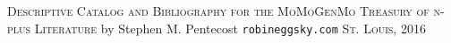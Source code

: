 \newpage
\begin{center}
\vspace*{5mm}
{\Huge
\textsc{Descriptive Catalog}
\linebreak
\linebreak
\textsc{and}
\linebreak
\linebreak
\textsc{Bibliography}
\linebreak
\linebreak
\textsc{for the}
\linebreak
\linebreak
\textsc{MoMoGenMo Treasury}
\linebreak
\linebreak
\textsc{of}
\linebreak
\linebreak
\textsc{n-plus Literature}
\linebreak
\linebreak
}
{\Large
\linebreak
\linebreak
\linebreak
\linebreak
\linebreak
\linebreak
by
\linebreak
\linebreak
\linebreak
}
{\huge
Stephen M. Pentecost
}
\linebreak
\linebreak
\linebreak
\linebreak
\linebreak
\linebreak
\linebreak
\linebreak
\linebreak
{\LARGE 
\texttt{robineggsky.com}
}
\linebreak
\linebreak
{\Large 
\textsc{St. Louis, 2016}
}
\end{center}
